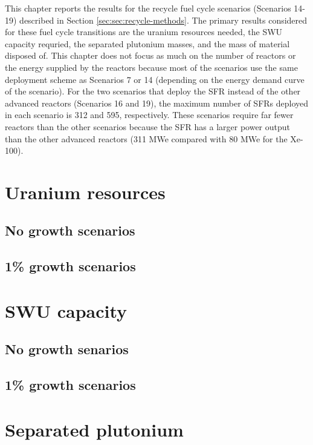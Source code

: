 This chapter reports the results for the recycle fuel cycle 
scenarios (Scenarios 14-19) described 
in Section \ref{sec:sec:recycle-methods}. The primary results considered 
for these fuel cycle transitions are the uranium resources needed, 
the \gls{SWU} capacity requried, the separated plutonium masses, 
and the mass of material disposed of. This chapter does not focus 
as much on the number of reactors or the energy supplied by 
the reactors because most of the scenarios use the same 
deployment scheme as Scenarios 7 or 14 (depending on 
the energy demand curve of the scenario). For the two 
scenarios that deploy the \gls{SFR} instead of the other 
advanced reactors (Scenarios 16 and 19), the maximum number 
of \glspl{SFR} deployed in each scenario is 312 and 595, 
respectively. 
These scenarios require far fewer reactors than the other scenarios 
because the \gls{SFR} has a larger power output than the other 
advanced reactors (311 MWe compared with 80 MWe for the Xe-100).

\section{Uranium resources}

\subsection{No growth scenarios}

\subsection{1\% growth scenarios}

\section{SWU capacity}

\subsection{No growth senarios}

\subsection{1\% growth scenarios}

\section{Separated plutonium}

